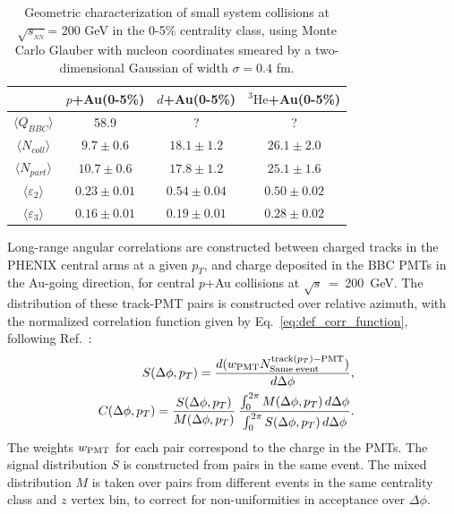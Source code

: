 \documentclass[%
reprint,
showpacs,preprintnumbers,
 amsmath,amssymb,
 aps,
]{revtex4-1}
\newcommand{\pt}{\mbox{$p_T$}\xspace}
\newcommand{\sqs}{\mbox{$\sqrt{s}$}\xspace}
\newcommand{\sqsn}{\mbox{$\sqrt{s_{_{NN}}}$}\xspace}
\newcommand{\dau}{\mbox{$d$+Au}\xspace}
\newcommand{\pau}{\mbox{$p$+Au}\xspace}
\newcommand{\hau}{\mbox{$^3\text{He}$+Au}\xspace}
\begin{document}
\begin{table}
\caption{Geometric characterization of small system collisions at \sqsn = 200 GeV in the 0-5\% centrality class, using Monte Carlo Glauber with nucleon coordinates smeared by a two-dimensional Gaussian of width $\sigma=0.4$ fm.}
\begin{ruledtabular}
\begin{tabular}{c c c c}
\label{table_geometry}
 & \pau (0-5\%) & \dau (0-5\%) & \hau (0-5\%) \\
\hline
 $\langle Q_{BBC} \rangle$ & 58.9 & ? & ? \\
 $\langle N_{coll} \rangle$ & $9.7\pm 0.6$ & $18.1\pm 1.2$ & $26.1\pm 2.0$ \\
 $\langle N_{part} \rangle$ & $10.7\pm 0.6$ & $17.8\pm 1.2$ & $25.1\pm  1.6$ \\ 
 $\langle \varepsilon_2 \rangle$ & $0.23\pm 0.01$ & $0.54\pm 0.04$ & $0.50\pm 0.02$ \\
 $\langle \varepsilon_3 \rangle$ & $0.16\pm 0.01$ & $0.19\pm 0.01$ & $0.28\pm 0.02$
\end{tabular}
\end{ruledtabular}
\end{table}

Long-range angular correlations are constructed between charged tracks in the PHENIX central arms at a given \pt, and charge deposited in the BBC PMTs in the Au-going direction, for central \pau collisions at \sqs~=~200~GeV. The distribution of these track-PMT pairs is constructed over relative azimuth, with the normalized correlation function given by Eq.~\ref{eq:def_corr_function}, following Ref.~\cite{PhysRevLett.115.142301}:
\begin{eqnarray}
  S(\Delta\phi,p_{T})=
  \frac{ d(w_{{\rm PMT}} N^{{\rm track}(p_{T}){\rm - PMT}}_{{\rm Same \; event}}) }{ d\Delta\phi}, & &
\label{eq31} \\
  C(\Delta\phi,p_{T}) =
          \frac{S(\Delta\phi,p_{T})}{M(\Delta\phi,p_{T})} \:
          \frac{\int_{0}^{2\pi} M(\Delta\phi,p_{T}) \, d\Delta\phi}{\int_{0}^{2\pi} S(\Delta\phi,p_{T}) \, d\Delta\phi}. & &
  \label{eq:def_corr_function}
\end{eqnarray}
The weights $w_{{\rm PMT}}$ for each pair correspond to the charge in the PMTs. The signal distribution $S$ is constructed from pairs in the same event. The mixed distribution $M$ is taken over pairs from different events in the same centrality class and $z$ vertex bin, to correct for non-uniformities in acceptance over $\Delta \phi$.
\end{document}
